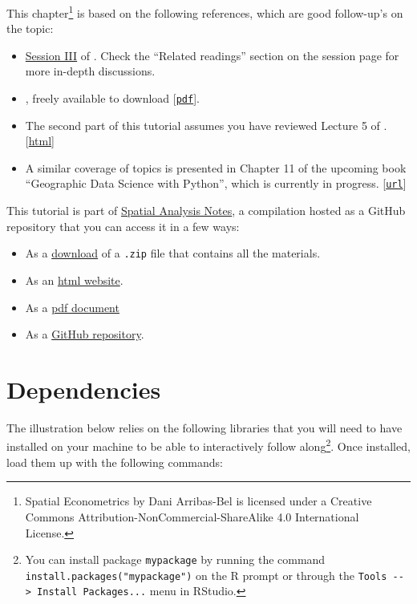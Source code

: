 \documentclass[]{book}
\providecommand{\tightlist}{%
  \setlength{\itemsep}{0pt}\setlength{\parskip}{0pt}}
\begin{document}
This chapter\footnote{{Spatial Econometrics} by Dani Arribas-Bel is
  licensed under a Creative Commons Attribution-NonCommercial-ShareAlike
  4.0 International License.} is based on the following references,
which are good follow-up's on the topic:

\begin{itemize}
\tightlist
\item
  \href{http://darribas.org/sdar_mini/notes/Class_03.html}{Session III}
  of \citet{arribas2014spatial}. Check the ``Related readings'' section
  on the session page for more in-depth discussions.
\item
  \citet{anselin2005spatial}, freely available to download
  {[}\href{http://csiss.org/GISPopSci/workshops/2011/PSU/readings/W15_Anselin2007.pdf}{\texttt{pdf}}{]}.
\item
  The second part of this tutorial assumes you have reviewed Lecture 5
  of \citet{darribas_gds19}.
  {[}\href{http://darribas.org/gds19/notes/Class_05.html}{html}{]}
\item
  A similar coverage of topics is presented in Chapter 11 of the
  upcoming book ``Geographic Data Science with Python'', which is
  currently in progress.
  {[}\href{https://geographicdata.science/book/notebooks/11_regression.html}{\texttt{url}}{]}
\end{itemize}

This tutorial is part of \href{index.html}{Spatial Analysis Notes}, a
compilation hosted as a GitHub repository that you can access it in a
few ways:

\begin{itemize}
\tightlist
\item
  As a
  \href{https://github.com/GDSL-UL/san/archive/master.zip}{download} of
  a \texttt{.zip} file that contains all the materials.
\item
  As an
  \href{https://gdsl-ul.github.io/san/spatial-econometrics.html}{html
  website}.
\item
  As a
  \href{https://gdsl-ul.github.io/san/spatial_analysis_notes.pdf}{pdf
  document}
\item
  As a \href{https://github.com/GDSL-UL/san}{GitHub repository}.
\end{itemize}

\section{Dependencies}\label{dependencies-3}

The illustration below relies on the following libraries that you will
need to have installed on your machine to be able to interactively
follow along\footnote{You can install package \texttt{mypackage} by
  running the command \texttt{install.packages("mypackage")} on the R
  prompt or through the
  \texttt{Tools\ -\/-\textgreater{}\ Install\ Packages...} menu in
  RStudio.}. Once installed, load them up with the following commands:
\end{document}
